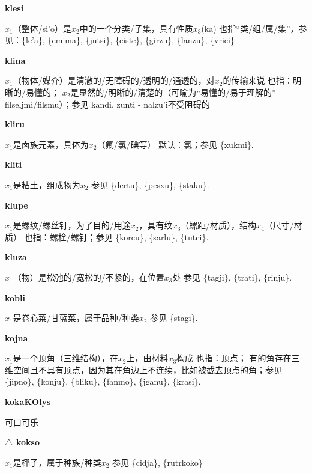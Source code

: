 \documentclass[notitlepage,twocolumn,a4paper,10pt]{book}
\begin{document}
{\sffamily\bfseries klesi}  $x_1$（整体\slash{}si'o）是$x_2$中的一个分类\slash{}子集，具有性质$x_3$(ka) \textemdash{} 也指“类\slash{}组\slash{}属\slash{}集”，参见：\{le'a\}, \{cmima\}, \{jutsi\}, \{ciste\}, \{girzu\}, \{lanzu\}, \{vrici\}

{\sffamily\bfseries klina}\enspace {\ttfamily\bfseries[    kli]}  $x_1$（物体\slash{}媒介）是清澈的\slash{}无障碍的\slash{}透明的\slash{}通透的，对$x_2$的传输来说 \textemdash{} 也指：明晰的\slash{}易懂的； $x_2$是显然的\slash{}明晰的\slash{}清楚的（可喻为“易懂的\slash{}易于理解的”= {filseljmi}\slash{}{filsmu}）；参见 {kandi}, {zunti} - {nalzu'i}不受阻碍的

{\sffamily\bfseries kliru} $x_1$是卤族元素，具体为$x_2$（氟\slash{}氯\slash{}碘等） \textemdash{} 默认：氯；参见 \{xukmi\}.

{\sffamily\bfseries kliti}\enspace {\ttfamily\bfseries[kit]}  $x_1$是粘土，组成物为$x_2$ \textemdash{} 参见 \{dertu\}, \{pesxu\}, \{staku\}.

{\sffamily\bfseries klupe}\enspace {\ttfamily\bfseries[lup     lu'e]}  $x_1$是螺纹\slash{}螺丝钉，为了目的\slash{}用途$x_2$，具有纹$x_3$（螺距\slash{}材质），结构$x_4$（尺寸\slash{}材质） \textemdash{} 也指：螺栓\slash{}螺钉；参见 \{korcu\}, \{sarlu\}, \{tutci\}.

{\sffamily\bfseries kluza}\enspace {\ttfamily\bfseries[luz]}  $x_1$（物）是松弛的\slash{}宽松的\slash{}不紧的，在位置$x_3$处 \textemdash{} 参见 \{tagji\}, \{trati\}, \{rinju\}.

{\sffamily\bfseries kobli}\enspace {\ttfamily\bfseries[kob     ko'i]}  $x_1$是卷心菜\slash{}甘蓝菜，属于品种\slash{}种类$x_2$ \textemdash{} 参见 \{stagi\}.

{\sffamily\bfseries kojna}\enspace {\ttfamily\bfseries[koj     ko'a]}  $x_1$是一个顶角（三维结构），在$x_2$上，由材料$x_3$构成 \textemdash{} 也指：顶点； 有的角存在三维空间且不具有顶点，因为其在角边上不连续，比如被截去顶点的角；参见 \{jipno\}, \{konju\}, \{bliku\}, \{fanmo\}, \{jganu\}, \{krasi\}.

{\sffamily\bfseries kokaKOlys} 可口可乐

{\sffamily\bfseries $\triangle$ kokso} $x_1$是椰子，属于种族\slash{}种类$x_2$ \textemdash{} 参见 \{cidja\}, \{rutrkoko\}
\end{document}
